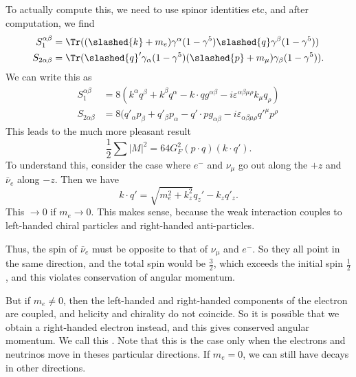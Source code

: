 \documentclass[a4paper]{article}
\begin{document}
To actually compute this, we need to use spinor identities etc, and after computation, we find
\begin{align*}
  S_1^{\alpha\beta} &= \Tr ((\slashed{k} + m_e) \gamma^\alpha (1 - \gamma^5) \slashed{q} \gamma^\beta(1 - \gamma^5))\\
  S_{2\alpha\beta} &= \Tr (\slashed{q}' \gamma_\alpha(1 - \gamma^5) (\slashed{p} + m_\mu) \gamma_\beta(1 - \gamma^5)).
\end{align*}
We can write this as
\begin{align*}
  S_1^{\alpha\beta} &= 8(k^\alpha q^\beta + k^\beta q^\alpha - k\cdot q g^{\alpha\beta} - i \varepsilon^{\alpha\beta\mu\rho} k_\mu q_\rho)\\
  S_{2\alpha\beta} &= 8(q'_\alpha p_\beta + q'_\beta p_\alpha - q' \cdot p g_{\alpha\beta} - i \varepsilon_{\alpha\beta\mu\rho} q'^\mu p^\rho
\end{align*}
This leads to the much more pleasant result
\[
  \frac{1}{2} \sum |M|^2 = 64 G_F^2 (p \cdot q)(k \cdot q').
\]
To understand this, consider the case where $e^-$ and $\nu_\mu$ go out along the $+z$ and $\bar{\nu}_e$ along $-z$. Then we have
\[
  k \cdot q' = \sqrt{m_e^2 + k_z^2} q_z' - k_z q'_z.
\]
This $\to 0$ if $m_e \to 0$. This makes sense, because the weak interaction couples to left-handed chiral particles and right-handed anti-particles.
\begin{center}
\end{center}
Thus, the spin of $\bar{\nu}_e$ must be opposite to that of $\nu_\mu$ and $e^-$. So they all point in the same direction, and the total spin would be $\frac{3}{2}$, which exceeds the initial spin $\frac{1}{2}$, and this violates conservation of angular momentum.

But if $m_e \not= 0$, then the left-handed and right-handed components of the electron are coupled, and helicity and chirality do not coincide. So it is possible that we obtain a right-handed electron instead, and this gives conserved angular momentum. We call this . Note that this is the case only when the electrons and neutrinos move in theses particular directions. If $m_e = 0$, we can still have decays in other directions.
\end{document}
